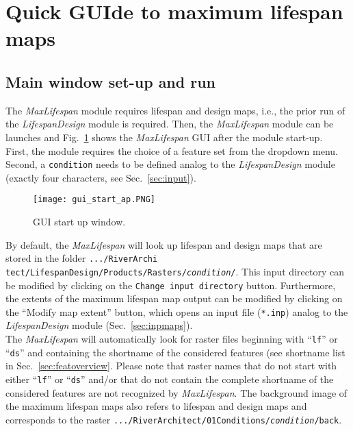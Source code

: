 \section{Quick GUIde to maximum lifespan maps} \label{sec:actquick}
\subsection{Main window set-up and run} 
The \textit{MaxLifespan} module requires lifespan and design maps, i.e., the prior run of the \textit{LifespanDesign} module is required. Then, the \textit{MaxLifespan} module can be launches and Fig.~\ref{fig:gui_start_ap} shows the \textit{MaxLifespan} GUI after the module start-up.\\
First, the module requires the choice of a feature set from the dropdown menu. Second, a \texttt{condition} needs to be defined analog to the \textit{LifespanDesign} module (exactly four characters, see Sec.~\ref{sec:input}).
\begin{figure}[hbt]
	\begin{center}
	\texttt{[image: gui\_start\_ap.PNG]} %
	\caption{GUI start up window. \label{fig:gui_start_ap}}
	\end{center}
\end{figure}

By default, the \textit{MaxLifespan} will look up lifespan and design maps that are stored in the folder \texttt{.../RiverArchi tect/LifespanDesign/Products/Rasters/\textit{condition}/}. This input directory can be modified by clicking on the \texttt{Change input directory} button. Furthermore, the extents of the maximum lifespan map output can be modified by clicking on the ``Modify map extent'' button, which opens an input file (\texttt{*.inp}) analog to the \textit{LifespanDesign} module (Sec.~\ref{sec:inpmaps}).\\
The \textit{MaxLifespan} will automatically look for raster files beginning with ``\texttt{lf}'' or ``\texttt{ds}'' and containing the shortname of the considered features (see shortname list in Sec.~\ref{sec:featoverview}. Please note that raster names that do not start with either ``\texttt{lf}'' or ``\texttt{ds}'' and/or that do not contain the complete shortname of the considered features are not recognized by \textit{MaxLifespan}. The background image of the maximum lifespan maps also refers to lifespan and design maps and corresponds to the raster \texttt{.../RiverArchitect/01{\myUnderscore}Conditions/\textit{condition}/back}.\\

